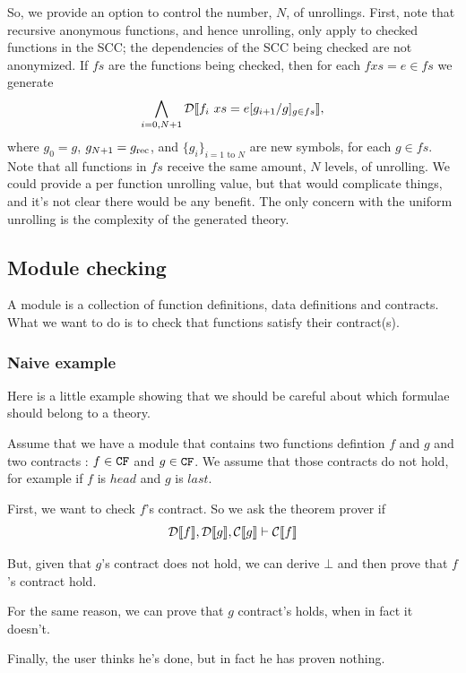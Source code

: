 \documentclass[preprint]{sigplanconf}
\begin{document}
 So, we provide an option to control the number, $N$, of unrollings.
 First, note that recursive anonymous functions, and hence unrolling,
 only apply to checked functions in the SCC; the dependencies of the
 SCC being checked are not anonymized.  If $fs$ are the functions
 being checked, then for each $f xs = e \in fs$ we generate
 \[
   \bigwedge_{i=0,N+1} \mathcal{D} \llbracket f_i ~xs = e[g_{i+1}/g]_{g \in fs} \rrbracket,
 \]
 where $g_0 = g$, $g_{N+1} = g_\text{rec}$, and $\{g_i\}_{i = 1 \text{ to } N }$ 
are new symbols, for each $g \in fs$.  Note that all functions
in $fs$ receive the same amount, $N$ levels, of unrolling.  We could
provide a per function unrolling value, but that would complicate
things, and it's not clear there would be any benefit.  The only
concern with the uniform unrolling is the complexity of the generated
theory.

\subsection{Module checking}
A module is a collection of function definitions, data definitions and
contracts. What we want to do is to check that functions satisfy their
contract(s). 

\subsubsection{Naive example}
Here is a little example showing that we should be careful about which
formulae should belong to a theory.

Assume that we have a module that contains two functions defintion $f$
and $g$ and two contracts : $f \in \texttt{CF}$ and $g \in \texttt{CF}$. We assume
that those contracts do not hold, for example if $f$ is $head$ and $g$
is $last$.

First, we want to check $f$'s contract. So we ask the theorem prover
if
$$ \mathcal{D} \llbracket f \rrbracket, \mathcal{D} \llbracket g \rrbracket, \mathcal{C} \llbracket g \rrbracket \vdash \mathcal{C} \llbracket f \rrbracket $$

But, given that $g$'s contract does not hold, we can derive $\bot$ and
then prove that $f$'s contract hold.

For the same reason, we can prove that $g$ contract's holds, when in
fact it doesn't.

Finally, the user thinks he's done, but in fact he has proven nothing.
\end{document}
